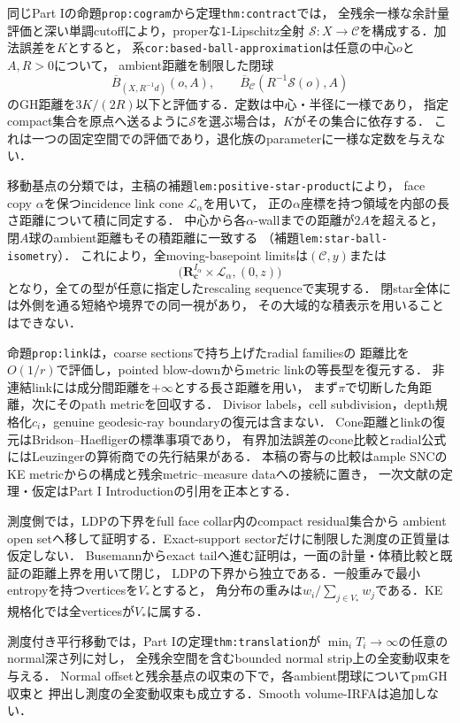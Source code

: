 \documentclass[a4paper,11pt]{ltjsarticle}
\numberwithin{equation}{section}
\theoremstyle{plain}
\theoremstyle{definition}
\theoremstyle{remark}
\newcommand{\RR}{\mathbf R}
\newcommand{\cC}{\mathcal C}
\newcommand{\cS}{\mathcal S}
\begin{document}
同じPart Iの命題\texttt{prop:cogram}から定理\texttt{thm:contract}では，
全残余一様な余計量評価と深い単調cutoffにより，properな$1$-Lipschitz全射
$\cS:X\to\cC$を構成する．加法誤差を$K$とすると，
系\texttt{cor:based-ball-approximation}は任意の中心$o$と$A,R>0$について，
ambient距離を制限した閉球
\[
 \overline B_{(X,R^{-1}d)}(o,A),\qquad
 \overline B_\cC(R^{-1}\cS(o),A)
\]
のGH距離を$3K/(2R)$以下と評価する．定数は中心・半径に一様であり，
指定compact集合を原点へ送るように$\cS$を選ぶ場合は，$K$がその集合に依存する．
これは一つの固定空間での評価であり，退化族のparameterに一様な定数を与えない．

移動基点の分類では，主稿の補題\texttt{lem:positive-star-product}により，
face copy $\alpha$を保つincidence link cone $\mathcal L_\alpha$を用いて，
正の$\alpha$座標を持つ領域を内部の長さ距離について積に同定する．
中心から各$\alpha$-wallまでの距離が$2A$を超えると，
閉$A$球のambient距離もその積距離に一致する
（補題\texttt{lem:star-ball-isometry}）．
これにより，全moving-basepoint limitsは$(\cC,y)$または
\[
 \bigl(\RR^{I_\alpha}_{\boldsymbol c}\times\mathcal L_\alpha,(0,z)\bigr)
\]
となり，全ての型が任意に指定したrescaling sequenceで実現する．
閉star全体には外側を通る短絡や境界での同一視があり，
その大域的な積表示を用いることはできない．

命題\texttt{prop:link}は，coarse sectionsで持ち上げたradial familiesの
距離比を$O(1/r)$で評価し，pointed blow-downからmetric linkの等長型を復元する．
非連結linkには成分間距離を$+\infty$とする長さ距離を用い，
まず$\pi$で切断した角距離，次にそのpath metricを回収する．
Divisor labels，cell subdivision，depth規格化$c_i$，genuine geodesic-ray boundaryの復元は含まない．
Cone距離とlinkの復元はBridson--Haefligerの標準事項であり，
有界加法誤差のcone比較とradial公式にはLeuzingerの算術商での先行結果がある．
本稿の寄与の比較はample SNCのKE metricからの構成と残余metric--measure dataへの接続に置き，
一次文献の定理・仮定はPart I Introductionの引用を正本とする．

測度側では，LDPの下界をfull face collar内のcompact residual集合から
ambient open setへ移して証明する．Exact-support sectorだけに制限した測度の正質量は仮定しない．
Busemannからexact tailへ進む証明は，一面の計量・体積比較と既証の距離上界を用いて閉じ，
LDPの下界から独立である．一般重みで最小entropyを持つverticesを$V_*$とすると，
角分布の重みは$w_i/\sum_{j\in V_*}w_j$である．KE規格化では全verticesが$V_*$に属する．


測度付き平行移動では，Part Iの定理\texttt{thm:translation}が
$\min_iT_i\to\infty$の任意のnormal深さ列に対し，
全残余空間を含むbounded normal strip上の全変動収束を与える．
Normal offsetと残余基点の収束の下で，各ambient閉球についてpmGH収束と
押出し測度の全変動収束も成立する．Smooth volume-IRFAは追加しない．
\end{document}
